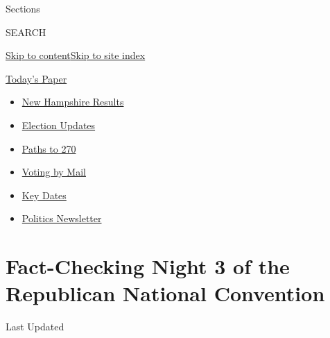 Sections

SEARCH

\protect\hyperlink{site-content}{Skip to
content}\protect\hyperlink{site-index}{Skip to site index}

\href{https://myaccount.nytimes3xbfgragh.onion/auth/login?response_type=cookie\&client_id=vi}{}

\href{https://www.nytimes3xbfgragh.onion/section/todayspaper}{Today's
Paper}

\begin{itemize}
\item
  \href{https://www.nytimes3xbfgragh.onion/interactive/2020/09/08/us/elections/results-new-hampshire-primary-elections.html?action=click\&pgtype=Article\&state=default\&region=TOP_BANNER\&context=storylines_menu}{New
  Hampshire Results}
\item
  \href{https://www.nytimes3xbfgragh.onion/live/2020/09/08/us/trump-vs-biden?action=click\&pgtype=Article\&state=default\&region=TOP_BANNER\&context=storylines_menu}{Election
  Updates}
\item
  \href{https://www.nytimes3xbfgragh.onion/interactive/2020/us/elections/election-states-biden-trump.html?action=click\&pgtype=Article\&state=default\&region=TOP_BANNER\&context=storylines_menu}{Paths
  to 270}
\item
  \href{https://www.nytimes3xbfgragh.onion/interactive/2020/08/31/us/politics/vote-by-mail-deadlines.html?action=click\&pgtype=Article\&state=default\&region=TOP_BANNER\&context=storylines_menu}{Voting
  by Mail}
\item
  \href{https://www.nytimes3xbfgragh.onion/interactive/2019/us/elections/2020-presidential-election-calendar.html?action=click\&pgtype=Article\&state=default\&region=TOP_BANNER\&context=storylines_menu}{Key
  Dates}
\item
  \href{https://www.nytimes3xbfgragh.onion/newsletters/politics?action=click\&pgtype=Article\&state=default\&region=TOP_BANNER\&context=storylines_menu}{Politics
  Newsletter}
\end{itemize}

\hypertarget{fact-checking-night-3-of-the-republican-national-convention}{%
\section{Fact-Checking Night 3 of the Republican National
Convention}\label{fact-checking-night-3-of-the-republican-national-convention}}

Last Updated

